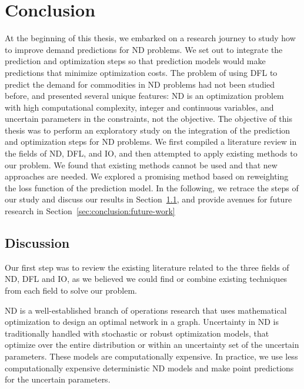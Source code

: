 \chapter{Conclusion} \label{sec:conclusion}

At the beginning of this thesis, we embarked on a research journey to study how to improve demand predictions for ND problems. We set out to integrate the prediction and optimization steps so that prediction models would make predictions that minimize optimization costs. The problem of using DFL to predict the demand for commodities in ND problems had not been studied before, and presented several unique features: ND is an optimization problem with high computational complexity, integer and continuous variables, and uncertain parameters in the constraints, not the objective. The objective of this thesis was to perform an exploratory study on the integration of the prediction and optimization steps for ND problems. We first compiled a literature review in the fields of ND, DFL, and IO, and then attempted to apply existing methods to our problem. We found that existing methods cannot be used and that new approaches are needed. We explored a promising method based on reweighting the loss function of the prediction model. In the following, we retrace the steps of our study and discuss our results in Section~\ref{sec:conclusion:discussion}, and provide avenues for future research in Section~\ref{sec:conclusion:future-work} 

\section{Discussion} \label{sec:conclusion:discussion}

Our first step was to review the existing literature related to the three fields of ND, DFL and IO, as we believed we could find or combine existing techniques from each field to solve our problem. 

ND is a well-established branch of operations research that uses mathematical optimization to design an optimal network in a graph. 
Uncertainty in ND is traditionally handled with stochastic or robust optimization models, that optimize over the entire distribution or within an uncertainty set of the uncertain parameters. These models are computationally expensive. 
In practice, we use less computationally expensive deterministic ND models and make point predictions for the uncertain parameters. 

